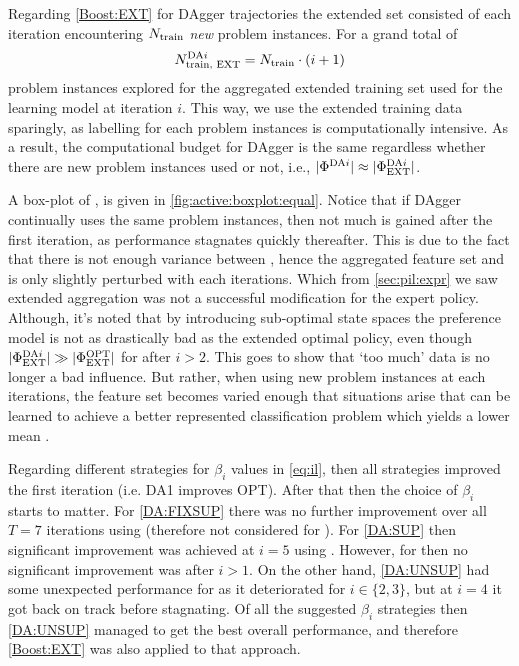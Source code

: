Regarding \ref{Boost:EXT} for DAgger trajectories the extended set 
consisted of each iteration encountering $N_{\text{train}}$ \emph{new} problem 
instances. For a grand total of 
\begin{equation}
N^{\text{DA}i}_{\text{train, EXT}}=N_{\text{train}}\cdot (i+1) 
\end{equation}
problem instances explored for the aggregated extended training set used for 
the learning model at iteration $i$.
This way, we use the extended training data sparingly, as labelling for each 
problem instances is computationally intensive. As a result, the computational 
budget for DAgger is the same regardless whether there are new problem 
instances used or not, i.e., 
$\lvert\Phi^{\text{DA}i}\rvert\approx\lvert\Phi^{\text{DA}i}_{\text{EXT}}\rvert$.

A box-plot of \namerho, is given in \cref{fig:active:boxplot:equal}. 
Notice that if DAgger continually uses the same problem instances, then not 
much is gained after the first iteration, as performance stagnates quickly 
thereafter.
This is due to the fact that there is not enough variance between 
, hence the aggregated feature set  and 
 is only 
slightly perturbed with each iterations. 
Which from \cref{sec:pil:expr} we saw extended aggregation was not a successful 
modification for the expert policy. Although, it's noted that by introducing 
sub-optimal state spaces the preference model is not as drastically bad as the 
extended optimal policy, even though 
$\lvert\Phi^{\text{DA}i}_{\text{EXT}}\rvert\gg\lvert\Phi^{\text{OPT}}_{\text{EXT}}\rvert$ for 
 after $i>2$. This goes to show that `too much' data is no longer 
a bad influence. 
But rather, when using new problem instances at each iterations, the feature 
set becomes varied enough that situations arise that can be learned to achieve 
a better represented classification problem which yields a lower mean \namerho.

Regarding different strategies for $\beta_i$ values in \cref{eq:il}, then all 
strategies improved the first iteration (i.e. DA1 improves OPT). After that 
then the choice of $\beta_i$ starts to matter. 
For \ref{DA:FIXSUP} there was no further improvement over all $T=7$ iterations 
using  (therefore not considered for ).
For \ref{DA:SUP} then significant improvement was achieved at $i=5$ using 
.
However, for  then no significant improvement was after $i>1$. 
On the other hand, \ref{DA:UNSUP} had some unexpected performance for 
 as it  deteriorated for $i\in\{2,3\}$, but at $i=4$ it got back on 
track before stagnating.
Of all the suggested $\beta_i$ strategies then \ref{DA:UNSUP} managed to get 
the best overall performance, and therefore \ref{Boost:EXT} was also applied to 
that approach. 

